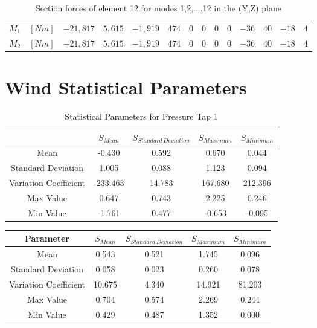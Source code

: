 \documentclass[11pt,a4paper,titlepage]{report}
\begin{document}
\begin{appendix}
\begin{landscape}
\begin{table}[]
\begin{tiny}
\begin{tabular}{c|c|c|c|c|c|c|c|c|c|c|c|c|c}
    $M_1$ & $[Nm]$ & $-21,817$ & $5,615$ & $-1,919$ & $474 $ & $0$ & $0$ & $0$ & $0$ & $-36$ & $40$ & $-18$ &  $4$\\
    $M_2$ & $[Nm]$ & $-21,817$ & $5,615$ & $-1,919$ & $474 $ & $0$ & $0$ & $0$ & $0$ & $-36$ & $40$ & $-18$ &  $4$\\
        \end{tabular}
        \end{tiny}
    \caption{Section forces of element 12 for modes 1,2,...,12 in the (Y,Z) plane}
    \label{tab:my_label}
\end{table}
\end{landscape}
\chapter{Wind Statistical Parameters}\label{sec:wind statistics appendix}
\begin{table}[h]
    \centering
    \begin{tabular}{c|c|c|c|c}
    & $S_{Mean}$ & $S_{Standard\,Deviation}$ & $S_{Maximum}$ &	$S_{Minimum}$ \\
    \hline
    Mean                  & -0.430   & 0.592  & 0.670   & 0.044   \\
Standard Deviation    & 1.005    & 0.088  & 1.123   & 0.094   \\
Variation Coefficient & -233.463 & 14.783 & 167.680 & 212.396 \\
Max Value             & 0.647    & 0.743  & 2.225   & 0.246   \\
Min Value             & -1.761   & 0.477  & -0.653  & -0.095 
    \end{tabular}
    \caption{Statistical Parameters for Pressure Tap 1}
    \label{tab:wind statistical parameters 1}
\end{table}
\begin{table}[h]
    \centering
    \begin{tabular}{c|c|c|c|c}
  Parameter  & $S_{Mean}$ & $S_{Standard\,Deviation}$ & $S_{Maximum}$ &	$S_{Minimum}$ \\
    \hline
  Mean                  & 0.543  & 0.521 & 1.745  & 0.096  \\
Standard Deviation    & 0.058  & 0.023 & 0.260  & 0.078  \\
Variation Coefficient & 10.675 & 4.340 & 14.921 & 81.203 \\
Max Value             & 0.704  & 0.574 & 2.269  & 0.244  \\
Min Value             & 0.429  & 0.487 & 1.352  & 0.000 
    \end{tabular}

\end{table}
\end{appendix}
\end{document}
